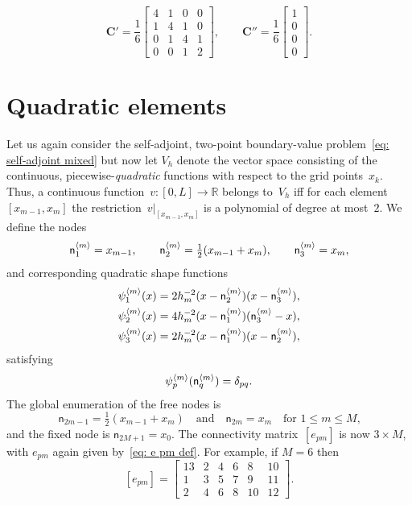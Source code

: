 \begin{example}
\[\boldsymbol{C}'=\frac{1}{6}\begin{bmatrix}
4&1&0&0\\ 1&4&1&0\\ 0&1&4&1\\ 0&0&1&2\end{bmatrix},\qquad
\boldsymbol{C}''=\frac{1}{6}\begin{bmatrix}1\\ 0\\ 0\\ 0\end{bmatrix}.
\]





\end{example}


\section{Quadratic elements}\label{sec: quadratic elements}

Let us again consider the self-adjoint, two-point boundary-value 
problem~\eqref{eq: self-adjoint mixed} but now let $V_h$ denote the vector 
space consisting of the continuous, piecewise-\emph{quadratic} functions with 
respect to the grid points~$x_k$.  Thus, a continuous 
function~$v:[0,L]\to\mathbb{R}$ belongs to~$V_h$ iff for each 
element~$[x_{m-1},x_m]$ the restriction~$v|_{[x_{m-1},x_m]}$ is a polynomial of 
degree at most~$2$.  We define the nodes
\[
\mathsf{n}^{\langle m\rangle}_1=x_{m-1},\qquad
\mathsf{n}^{\langle m\rangle}_2=\tfrac12(x_{m-1}+x_m),\qquad
\mathsf{n}^{\langle m\rangle}_3=x_m,
\]
and corresponding quadratic shape functions
\begin{align*}
\psi^{\langle m\rangle}_1(x)
	&=2h_m^{-2}(x-\mathsf{n}^{\langle m\rangle}_2)(x-\mathsf{n}^{\langle m\rangle}_3),\\
\psi^{\langle m\rangle}_2(x)
	&=4h_m^{-2}(x-\mathsf{n}^{\langle m\rangle}_1)(\mathsf{n}^{\langle m\rangle}_3-x),\\
\psi^{\langle m\rangle}_3(x)
	&=2h_m^{-2}(x-\mathsf{n}^{\langle m\rangle}_1)(x-\mathsf{n}^{\langle m\rangle}_2),
\end{align*}
satisfying
\[
\psi^{\langle m\rangle}_p(\mathsf{n}^{\langle m\rangle}_q)=\delta_{pq}.
\]
The global enumeration of the free nodes is
\[
\mathsf{n}_{2m-1}=\tfrac12(x_{m-1}+x_m)
\quad\text{and}\quad
\mathsf{n}_{2m}=x_m\quad\text{for $1\le m\le M$,}
\]
and the fixed node is $\mathsf{n}_{2M+1}=x_0$.  The connectivity 
matrix~$[e_{pm}]$ is now $3\times M$, with $e_{pm}$ again given 
by~\eqref{eq: e pm def}.  For example, if $M=6$ then 
\[
[e_{pm}]=\begin{bmatrix}
13&2&4&6&8&10\\
 1&3&5&7&9&11\\
 2&4&6&8&10&12          
\end{bmatrix}.
\]

